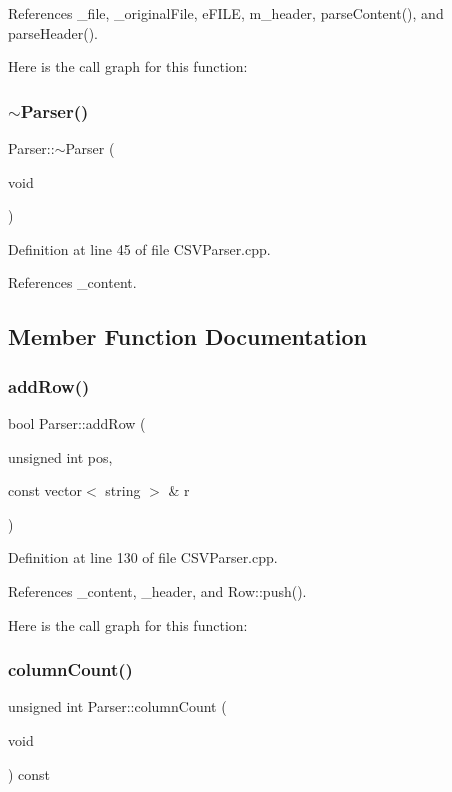 References \+\_\+file, \+\_\+original\+File, e\+F\+I\+LE, m\+\_\+header, parse\+Content(), and parse\+Header().

Here is the call graph for this function\+:
\mbox{\label{class_parser_a1e70d9a903c5d2e8166fb571de3d581c}} 
\subsubsection{$\sim$\+Parser()}
{\footnotesize\ttfamily Parser\+::$\sim$\+Parser (\begin{DoxyParamCaption}\item[{void}]{ }\end{DoxyParamCaption})}



Definition at line 45 of file C\+S\+V\+Parser.\+cpp.



References \+\_\+content.



\subsection{Member Function Documentation}
\mbox{\label{class_parser_afe0f826abe9a149bbe798664cd9022ec}} 
\subsubsection{add\+Row()}
{\footnotesize\ttfamily bool Parser\+::add\+Row (\begin{DoxyParamCaption}\item[{unsigned int}]{pos,  }\item[{const vector$<$ string $>$ \&}]{r }\end{DoxyParamCaption})}



Definition at line 130 of file C\+S\+V\+Parser.\+cpp.



References \+\_\+content, \+\_\+header, and Row\+::push().

Here is the call graph for this function\+:
\mbox{\label{class_parser_a5f0dfff7f5168d2ca894319651f102e3}} 
\subsubsection{column\+Count()}
{\footnotesize\ttfamily unsigned int Parser\+::column\+Count (\begin{DoxyParamCaption}\item[{void}]{ }\end{DoxyParamCaption}) const}



